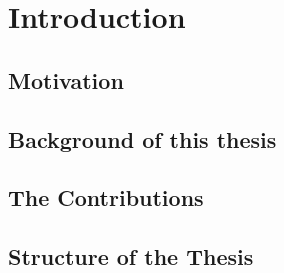 
\chapter{Introduction}  %

\ifpdf
    \graphicspath{{Chapter1/Figs/Raster/}{Chapter1/Figs/PDF/}{Chapter1/Figs/}}
\else
    \graphicspath{{Chapter1/Figs/Vector/}{Chapter1/Figs/}}
\fi


\section{Motivation} %



\section{Background of this thesis} %



\section{The Contributions}  %

\section{Structure of the Thesis}  %

